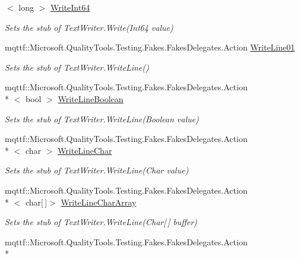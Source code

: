\begin{DoxyCompactItemize}
$<$ long $>$ \hyperlink{class_system_1_1_i_o_1_1_fakes_1_1_stub_text_writer_ad64a3a2ef82af8fe3dfe8e2f6674ed3b}{Write\-Int64}
\begin{DoxyCompactList}\small\item\em Sets the stub of Text\-Writer.\-Write(\-Int64 value)\end{DoxyCompactList}\item 
mqttf\-::\-Microsoft.\-Quality\-Tools.\-Testing.\-Fakes.\-Fakes\-Delegates.\-Action \hyperlink{class_system_1_1_i_o_1_1_fakes_1_1_stub_text_writer_a8cbe521386f25838d7c8438c837948b2}{Write\-Line01}
\begin{DoxyCompactList}\small\item\em Sets the stub of Text\-Writer.\-Write\-Line()\end{DoxyCompactList}\item 
mqttf\-::\-Microsoft.\-Quality\-Tools.\-Testing.\-Fakes.\-Fakes\-Delegates.\-Action\\*
$<$ bool $>$ \hyperlink{class_system_1_1_i_o_1_1_fakes_1_1_stub_text_writer_a95779ca386fcef4c1f22d1720e659fdb}{Write\-Line\-Boolean}
\begin{DoxyCompactList}\small\item\em Sets the stub of Text\-Writer.\-Write\-Line(\-Boolean value)\end{DoxyCompactList}\item 
mqttf\-::\-Microsoft.\-Quality\-Tools.\-Testing.\-Fakes.\-Fakes\-Delegates.\-Action\\*
$<$ char $>$ \hyperlink{class_system_1_1_i_o_1_1_fakes_1_1_stub_text_writer_a261c5f2525497bb6d00fa75424be8897}{Write\-Line\-Char}
\begin{DoxyCompactList}\small\item\em Sets the stub of Text\-Writer.\-Write\-Line(\-Char value)\end{DoxyCompactList}\item 
mqttf\-::\-Microsoft.\-Quality\-Tools.\-Testing.\-Fakes.\-Fakes\-Delegates.\-Action\\*
$<$ char\mbox{[}$\,$\mbox{]}$>$ \hyperlink{class_system_1_1_i_o_1_1_fakes_1_1_stub_text_writer_a5c7a9391af6452fe3af9139d719c26ac}{Write\-Line\-Char\-Array}
\begin{DoxyCompactList}\small\item\em Sets the stub of Text\-Writer.\-Write\-Line(\-Char\mbox{[}$\,$\mbox{]} buffer)\end{DoxyCompactList}\item 
mqttf\-::\-Microsoft.\-Quality\-Tools.\-Testing.\-Fakes.\-Fakes\-Delegates.\-Action\\*

\end{DoxyCompactItemize}
